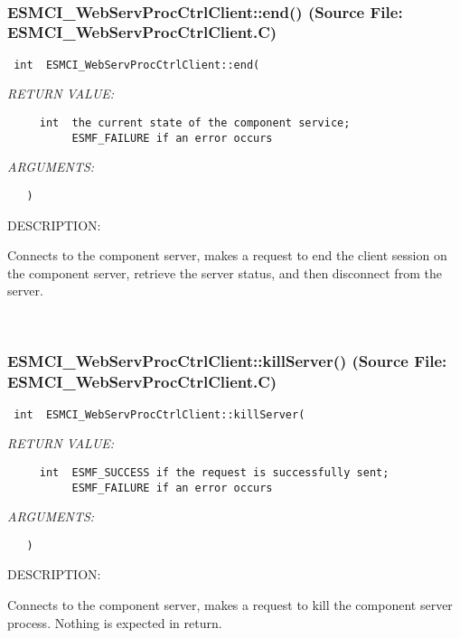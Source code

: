 \mbox{}\hrulefill\
 
\subsubsection{ESMCI\_WebServProcCtrlClient::end() (Source File: ESMCI\_WebServProcCtrlClient.C)}


  
\begin{verbatim} int  ESMCI_WebServProcCtrlClient::end(\end{verbatim}{\em RETURN VALUE:}
\begin{verbatim}     int  the current state of the component service;
          ESMF_FAILURE if an error occurs\end{verbatim}{\em ARGUMENTS:}
\begin{verbatim}   )\end{verbatim}
{\sf DESCRIPTION:\\ }


      Connects to the component server, makes a request to end the client
      session on the component server, retrieve the server status, and then
      disconnect from the server.
   
 
\mbox{}\hrulefill\
 
\subsubsection{ESMCI\_WebServProcCtrlClient::killServer() (Source File: ESMCI\_WebServProcCtrlClient.C)}


  
\begin{verbatim} int  ESMCI_WebServProcCtrlClient::killServer(\end{verbatim}{\em RETURN VALUE:}
\begin{verbatim}     int  ESMF_SUCCESS if the request is successfully sent;
          ESMF_FAILURE if an error occurs\end{verbatim}{\em ARGUMENTS:}
\begin{verbatim}   )\end{verbatim}
{\sf DESCRIPTION:\\ }


      Connects to the component server, makes a request to kill the component
      server process.  Nothing is expected in return.
  
\setlength{\parskip}{\oldparskip}
\setlength{\parindent}{\oldparindent}
\setlength{\baselineskip}{\oldbaselineskip}
